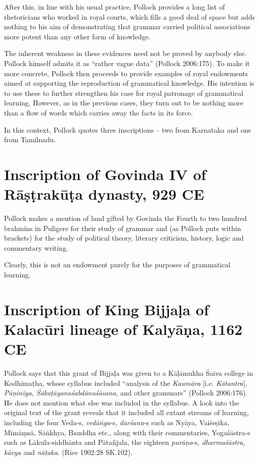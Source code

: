 After this, in line with his usual practice, Pollock provides a long list of rhetoricians who worked in royal courts, which fills a good deal of space but adds nothing to his aim of demonstrating that grammar carried political associations more potent than any other form of knowledge.

The inherent weakness in these evidences need not be proved by anybody else. Pollock himself admits it as ``rather vague data'' (Pollock 2006:175). To make it more concrete, Pollock then proceeds to provide examples of royal endowments aimed at supporting the reproduction of grammatical knowledge. His intention is to use these to further strengthen his case for royal patronage of grammatical learning. However, as in the previous cases, they turn out to be nothing more than a flow of words which carries away the facts in its force.

In this context, Pollock quotes three inscriptions -- two from Karnataka and one from Tamilnadu.

\section{Inscription of Govinda IV of Rāṣṭrakūṭa dynasty, 929 CE}\label{chap3-sec16}

Pollock makes a mention of land gifted by Govinda the Fourth to two hundred brahmins in Puligere for their study of grammar and (as Pollock puts within brackets) for the study of political theory, literary criticism, history, logic and commentary writing. 

Clearly, this is not an endowment purely for the purposes of grammatical learning.

\section{Inscription of King Bijjaḷa of Kalacūri lineage of Kalyāṇa, 1162 CE}\label{chap3-sec17}

Pollock says that this grant of Bijjaḷa was given to a Kāḷāmukha Śaiva college in Kodhimaṭha, whose syllabus included ``analysis of the {\sl Kaumāra} [i.e. {\sl Kātantra}], {\sl Pāṇinīya, Śākaṭāyanaśabdānuśāsana}, and other grammars'' (Pollock 2006:176). He does not mention what else was included in the syllabus. A look into the original text of the grant reveals that it included all extant streams of learning, including the four Veda-s, {\sl vedāṅga}-s, {\sl darśana}-s such as Nyāya, Vaiśeṣika, Mīmāṃsā, Sāṅkhya, Bauddha etc., along with their commentaries, Yogaśāstra-s such as Lākula-siddhānta and Pātañjala, the eighteen {\sl purāṇa}-s, {\sl dharmaśāstra, kāvya} and {\sl nāṭaka}. (Rice 1902:28 SK.102).

